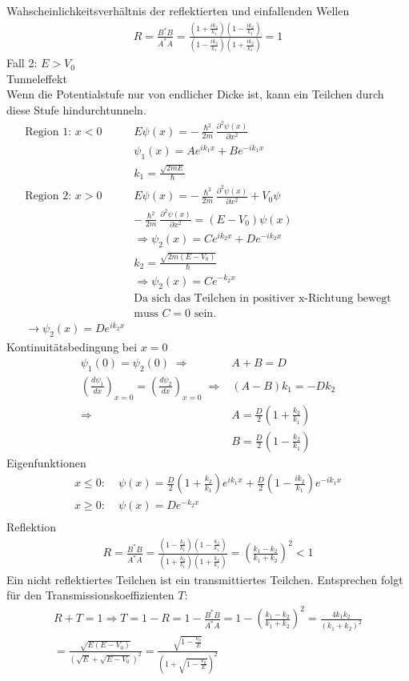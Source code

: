 \documentclass[10pt,a4paper]{article}
\begin{document}
Wahscheinlichkeitsverhältnis der reflektierten und einfallenden Wellen
\begin{align}
R=\frac{B^*B}{A^*A}=\frac{(1+\frac{ik_2}{k_1})(1-\frac{ik_2}{k_1})}{(1-\frac{ik_2}{k_1})(1+\frac{ik_2}{k_1})}=1
\end{align}
Fall 2: $E>V_0$\\
Tunneleffekt\\
Wenn die Potentialstufe nur von endlicher Dicke ist, kann ein Teilchen durch diese Stufe hindurchtunneln.
\begin{align}
\text{Region 1: }x<0 \;&E\psi(x)= -\frac{\hslash^2}{2m}\frac{\partial^2\psi(x)}{\partial x^2}\\
&\psi_1(x)=Ae^{ik_1x}+Be^{-ik_1x}\\
&k_1=\frac{\sqrt{2mE}}{\hslash}\\
\text{Region 2: }x>0 \;&E\psi(x)= -\frac{\hslash^2}{2m}\frac{\partial^2\psi(x)}{\partial x^2}+V_0\psi\\
& -\frac{\hslash^2}{2m}\frac{\partial^2\psi(x)}{\partial x^2} = (E-V_0)\psi(x)\\
&\Rightarrow \psi_2(x)=Ce^{ik_2x}+De^{-ik_2x}\\
&k_2=\frac{\sqrt{2m(E-V_0)}}{\hslash} \\
&\Rightarrow \psi_2(x)=Ce^{-k_2x}\\
&\text{Da sich das Teilchen in positiver x-Richtung bewegt}\\
&\text{muss $C=0$ sein.}\\
\rightarrow \psi_2(x)=De^{ik_2x}
\end{align}
Kontinuitätsbedingung bei $x=0$\\
\begin{align}
\psi_1(0)=\psi_2(0) \;\Rightarrow &A+B = D\\
(\frac{d\psi_1}{dx})_{x=0}=(\frac{d\psi_2}{dx})_{x=0}\;\Rightarrow &(A-B)k_1= -Dk_2\\
\Rightarrow &A= \frac{D}{2}(1+\frac{k_2}{k_1})\\
&B= \frac{D}{2}(1-\frac{k_2}{k_1})
\end{align}
Eigenfunktionen
\begin{align}
x\leq 0:\;& \psi(x)=\frac{D}{2}(1+\frac{k_2}{k_1})e^{ik_1x}+\frac{D}{2}(1-\frac{ik_2}{k_1})e^{-ik_1x}\\
x\geq 0:\;& \psi(x)=De^{-k_2x}\\
\end{align}
Reflektion
\begin{align}
R=\frac{B^*B}{A^*A}=\frac{(1-\frac{k_2}{k_1})(1-\frac{k_2}{k_1})}{(1+\frac{k_2}{k_1})(1+\frac{k_2}{k_1})}=(\frac{k_1-k_2}{k_1+k_2})^2<1
\end{align}
Ein nicht reflektiertes Teilchen ist ein transmittiertes Teilchen. Entsprechen folgt für den Transmissionskoeffizienten $T$:
\begin{align}
R+T=1 \Rightarrow T=1-R = 1-\frac{B^*B}{A^*A} = 1-(\frac{k_1-k_2}{k_1+k_2})^2 = \frac{4k_1k_2}{(k_1+k_2)^2}\\=\frac{\sqrt{E(E-V_0)}}{(\sqrt{E}+\sqrt{E-V_0})^2}=\frac{\sqrt{1-\frac{V_0}{E}}}{(1+\sqrt{1-\frac{V_0}{E}})^2}
\end{align}
\end{document}
